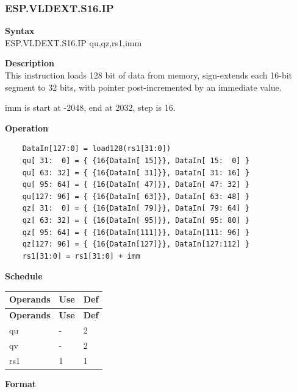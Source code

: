 \newpage
\subsubsection{ESP.VLDEXT.S16.IP}\label{instruction:ESPVLDEXTS16IP}
\textbf{Syntax}\\
ESP.VLDEXT.S16.IP qu,qz,rs1,imm

\textbf{Description}\\
This instruction loads 128 bit of data from memory, sign-extends each 16-bit segment to 32 bits, with pointer post-incremented by an immediate value.

imm is start at -2048, end at 2032, step is 16.

\textbf{Operation}\\
\begin{lstlisting}
    DataIn[127:0] = load128(rs1[31:0])
    qu[ 31:  0] = { {16{DataIn[ 15]}}, DataIn[ 15:  0] }
    qu[ 63: 32] = { {16{DataIn[ 31]}}, DataIn[ 31: 16] }
    qu[ 95: 64] = { {16{DataIn[ 47]}}, DataIn[ 47: 32] }
    qu[127: 96] = { {16{DataIn[ 63]}}, DataIn[ 63: 48] }
    qz[ 31:  0] = { {16{DataIn[ 79]}}, DataIn[ 79: 64] }
    qz[ 63: 32] = { {16{DataIn[ 95]}}, DataIn[ 95: 80] }
    qz[ 95: 64] = { {16{DataIn[111]}}, DataIn[111: 96] }
    qz[127: 96] = { {16{DataIn[127]}}, DataIn[127:112] }
    rs1[31:0] = rs1[31:0] + imm
\end{lstlisting}

\textbf{Schedule}\\
\begin{longtable}[c]{|l|l|l|}
    \hline
    \rowcolor{lightgray}
    \textbf{Operands} & \textbf{Use} & \textbf{Def} \\\hline
    \endfirsthead
    \hline
    \rowcolor{lightgray}
     \textbf{Operands} & \textbf{Use} & \textbf{Def} \\\hline
    \endhead
    \hline
    \endfoot

  qu & - & 2 \\\hline
  qv & - & 2 \\\hline
  rs1 & 1 & 1

\end{longtable}

\textbf{Format}\\

